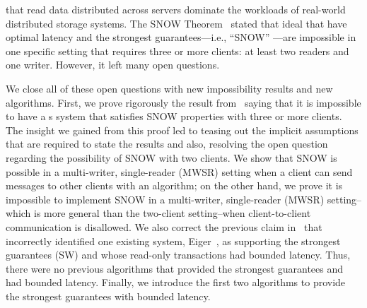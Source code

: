 {\color{blue}
\rots{} that read data distributed across servers dominate the workloads of real-world distributed storage systems.
The SNOW Theorem~\cite{SNOW2016} stated that ideal \rots{} that have optimal latency and the strongest guarantees---i.e., ``SNOW'' \rots{}---are impossible in one specific setting that requires three or more clients: at least two readers and one writer. However, it left many open questions.

We close all of these open questions with new impossibility results and new algorithms.
First, we prove rigorously the result from~\cite{SNOW2016} saying that it is impossible to have a \rot{}s system that satisfies SNOW properties with three or more clients.
The insight we gained from this proof led to teasing out the implicit assumptions that are required to state the results and also, resolving the open question regarding the possibility of SNOW with two clients.
We show that SNOW  is possible in a multi-writer, single-reader (MWSR) setting when a client can send messages to other clients with an algorithm;
on the other hand, we prove it is impossible to implement SNOW in a multi-writer, single-reader (MWSR) setting--which is more general than the two-client setting--when client-to-client communication is disallowed.
We also correct the previous claim in~\cite{SNOW2016} that incorrectly identified one existing system, Eiger~\cite{Lloyd:nsdi2013}, as supporting the strongest guarantees (SW) and whose read-only transactions had bounded latency. Thus, there were no previous algorithms that provided the strongest guarantees and had bounded latency. Finally, we introduce the first two algorithms to provide the strongest guarantees with bounded latency.

}





